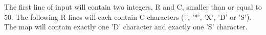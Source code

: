 The first line of input will contain two integers, R and C, smaller than or equal to 50. The following R lines will each contain C characters ('.', '*', 'X', 'D' or 'S'). The map will contain exactly one 'D' character and exactly one 'S' character.